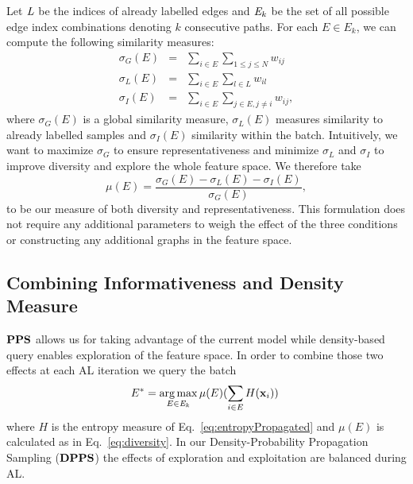 \documentclass[10pt,twocolumn,letterpaper]{article}
\DeclareMathOperator*{\argmax}{arg\,max}
\begin{document}
Let $\mathit{L}$ be the indices of already labelled edges and $\mathit{E}_k$ be the set of
all possible edge index combinations denoting $k$ consecutive paths. For each $E
\in E_k$,
we can compute the following similarity measures:
\begin{eqnarray}
\sigma_G(E) & = & \sum_{i \in E} \sum_{1 \leq j \leq N} w_{ij} \\
\sigma_L(E) & = & \sum_{i \in E} \sum_{l \in L} w_{il} \\
\sigma_I(E) & = & \sum_{i \in E} \sum_{j \in E, j\neq i} w_{ij},
\end{eqnarray}
where $\sigma_G(E)$  is  a  global  similarity measure, $\sigma_L(E)$  measures
similarity to  already labelled samples  and $\sigma_I(E)$ similarity  within the
batch.  Intuitively, we want to maximize $\sigma_G$ to ensure representativeness
and minimize $\sigma_L$  and $\sigma_I$ to improve diversity and explore the whole feature space.  We therefore take
\begin{equation}
  \mu(E) = \frac{\sigma_G(E) - \sigma_L(E) - \sigma_I(E)}{\sigma_G(E)},
  \label{eq:diversity}
\end{equation}
to be our measure of both  diversity and representativeness.  This formulation does not require any additional parameters to weigh the effect of the three conditions or constructing any additional graphs in the feature space. 

\subsection{Combining Informativeness and Density Measure}\label{sec:combining}$\textbf{PPS}$ allows us for taking advantage of the current model while density-based query enables exploration of the feature space. In order to combine those two effects at each AL iteration we query the batch 
\begin{equation}
E^* = \argmax_{E \in \bE_k} \mu(E) (\sum_{i \in E} H(\bx_i)) \;
\label{eq:combined} 
\end{equation}
where         $H$        is         the        entropy         measure        of
Eq.~\ref{eq:entropyPropagated} and $\mu(E)$ is calculated as in Eq.~\ref{eq:diversity}. In our Density-Probability Propagation Sampling ($\textbf{DPPS}$) the effects of exploration and exploitation are balanced during AL.  
\centering
{}
\\
\end{document}
